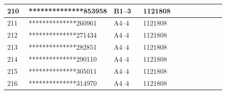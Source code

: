 \documentclass[UTF8,10pt,a4paper,fontset=fandol]{ctexart}
\newcommand{\fieldvalue}[1]{#1}
\begin{document}
\begin{center}
\begin{tabular}{|p{0.10\linewidth}|p{0.25\linewidth}|p{0.14\linewidth}|p{0.24\linewidth}|p{0.16\linewidth}|}
\fieldvalue{210} &
\fieldvalue{**************853958} &
\fieldvalue{B1--3} &
\fieldvalue{1121808} & \\ \hline

\fieldvalue{211} &
\fieldvalue{**************260961} &
\fieldvalue{A4--4} &
\fieldvalue{1121808} & \\ \hline

\fieldvalue{212} &
\fieldvalue{**************271434} &
\fieldvalue{A4--4} &
\fieldvalue{1121808} & \\ \hline

\fieldvalue{213} &
\fieldvalue{**************282851} &
\fieldvalue{A4--4} &
\fieldvalue{1121808} & \\ \hline

\fieldvalue{214} &
\fieldvalue{**************290110} &
\fieldvalue{A4--4} &
\fieldvalue{1121808} & \\ \hline

\fieldvalue{215} &
\fieldvalue{**************305011} &
\fieldvalue{A4--4} &
\fieldvalue{1121808} & \\ \hline

\fieldvalue{216} &
\fieldvalue{**************314970} &
\fieldvalue{A4--4} &
\fieldvalue{1121808} & \\ \hline


\end{tabular}
\end{center}
\end{document}
